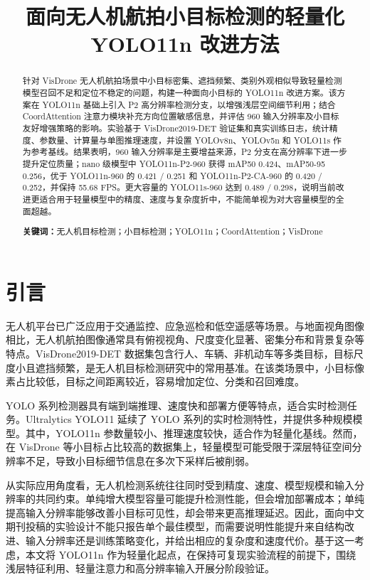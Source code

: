 \documentclass[UTF8,a4paper,10.5pt,fontset=windows]{ctexart}
\title{\heiti 面向无人机航拍小目标检测的轻量化 YOLO11n 改进方法}
\author{}
\date{}
\newcommand{\YOLOBase}{\mbox{YOLO11n}}
\newcommand{\YOLOPtwoNine}{\mbox{YOLO11n-P2-960}}
\newcommand{\YOLOPtwoCANine}{\mbox{YOLO11n-P2-CA-960}}
\newcommand{\YOLOEightN}{\mbox{YOLOv8n}}
\newcommand{\YOLOElevenS}{\mbox{YOLO11s}}
\newcommand{\CoordAtt}{\mbox{CoordAttention}}
\begin{document}
\maketitle

\begin{abstract}
针对 VisDrone 无人机航拍场景中小目标密集、遮挡频繁、类别外观相似导致轻量检测模型召回不足和定位不稳定的问题，构建一种面向小目标的 \YOLOBase{} 改进方案。该方案在 \YOLOBase{} 基础上引入 P2 高分辨率检测分支，以增强浅层空间细节利用；结合 \CoordAtt{} 注意力模块补充方向位置敏感信息，并评估 960 输入分辨率及小目标友好增强策略的影响。实验基于 VisDrone2019-DET 验证集和真实训练日志，统计精度、参数量、计算量与单图推理速度，并设置 \YOLOEightN{}、YOLOv5n 和 \YOLOElevenS{} 作为参考基线。结果表明，960 输入分辨率是主要增益来源，P2 分支在高分辨率下进一步提升定位质量；nano 级模型中 \YOLOPtwoNine{} 获得 mAP50 0.424、mAP50-95 0.256，优于 \YOLOBase{}-960 的 0.421 / 0.251 和 \YOLOPtwoCANine{} 的 0.420 / 0.252，并保持 55.68 FPS。更大容量的 \YOLOElevenS{}-960 达到 0.489 / 0.298，说明当前改进更适合用于轻量模型中的精度、速度与复杂度折中，不能简单视为对大容量模型的全面超越。

\noindent\textbf{关键词：}无人机目标检测；小目标检测；\YOLOBase{}；\CoordAtt{}；VisDrone
\end{abstract}

\section{引言}

无人机平台已广泛应用于交通监控、应急巡检和低空遥感等场景。与地面视角图像相比，无人机航拍图像通常具有俯视视角、尺度变化显著、密集分布和背景复杂等特点。VisDrone2019-DET 数据集包含行人、车辆、非机动车等多类目标，目标尺度小且遮挡频繁，是无人机目标检测研究中的常用基准\cite{du2019visdrone}。在该类场景中，小目标像素占比较低，目标之间距离较近，容易增加定位、分类和召回难度。

YOLO 系列检测器具有端到端推理、速度快和部署方便等特点，适合实时检测任务。Ultralytics YOLO11 延续了 YOLO 系列的实时检测特性，并提供多种规模模型\cite{khanam2024yolov11,ultralytics_yolo11}。其中，\YOLOBase{} 参数量较小、推理速度较快，适合作为轻量化基线。然而，在 VisDrone 等小目标占比较高的数据集上，轻量模型可能受限于深层特征空间分辨率不足，导致小目标细节信息在多次下采样后被削弱。

从实际应用角度看，无人机检测系统往往同时受到精度、速度、模型规模和输入分辨率的共同约束。单纯增大模型容量可能提升检测性能，但会增加部署成本；单纯提高输入分辨率能够改善小目标可见性，却会带来更高推理延迟。因此，面向中文期刊投稿的实验设计不能只报告单个最佳模型，而需要说明性能提升来自结构改进、输入分辨率还是训练策略变化，并给出相应的复杂度和速度代价。基于这一考虑，本文将 \YOLOBase{} 作为轻量化起点，在保持可复现实验流程的前提下，围绕浅层特征利用、轻量注意力和高分辨率输入开展分阶段验证。
\end{document}
